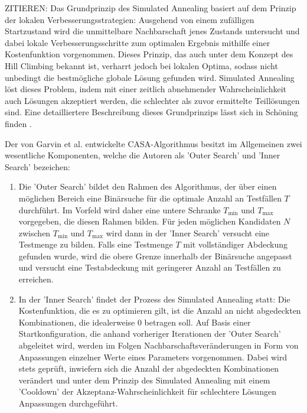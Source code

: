 ZITIEREN: Das Grundprinzip des Simulated Annealing basiert auf dem Prinzip der lokalen Verbesserungsstrategien: Ausgehend von einem zufälligen Startzustand wird die unmittelbare Nachbarschaft jenes Zustands untersucht und dabei lokale Verbesserungsschritte zum optimalen Ergebnis mithilfe einer Kostenfunktion vorgenommen. Dieses Prinzip, das auch unter dem Konzept des Hill Climbing bekannt ist, verharrt jedoch bei lokalen Optima, sodass nicht unbedingt die bestmögliche globale Lösung gefunden wird. Simulated Annealing löst dieses Problem, indem mit einer zeitlich abnehmender Wahrscheinlichkeit auch Lösungen akzeptiert werden, die schlechter als zuvor ermittelte Teillösungen sind. Eine detailliertere Beschreibung dieses Grundprinzips lässt sich in Schöning finden \cite{schoening2001algorithmik}.

Der von Garvin et al. \cite{garvin2011evaluating} entwickelte CASA-Algorithmus besitzt im Allgemeinen zwei wesentliche Komponenten, welche die Autoren als 'Outer Search' und 'Inner Search' bezeichen:
\begin{enumerate}
\item Die 'Outer Search' bildet den Rahmen des Algorithmus, der über einen möglichen Bereich eine Binärsuche für die optimale Anzahl an Testfällen $T$ durchführt. Im Vorfeld wird daher eine untere Schranke $T_{\min}$ und $T_{\max}$ vorgegeben, die diesen Rahmen bilden. Für jeden möglichen Kandidaten $N$ zwischen  $T_{\min}$ und $T_{\max}$ wird dann in der 'Inner Search' versucht eine Testmenge zu bilden. Falls eine Testmenge $T$ mit vollständiger Abdeckung gefunden wurde, wird die obere Grenze innerhalb der Binärsuche angepasst und versucht eine Testabdeckung mit geringerer Anzahl an Testfällen zu erreichen.
\item In der 'Inner Search' findet der Prozess des Simulated Annealing statt: Die Kostenfunktion, die es zu optimieren gilt, ist die Anzahl an nicht abgedeckten Kombinationen, die idealerweise 0 betragen soll. Auf Basis einer Startkonfiguration, die anhand vorheriger Iterationen der 'Outer Search' abgeleitet wird, werden im Folgen Nachbarschaftsveränderungen in Form von Anpassungen einzelner Werte eines Parameters vorgenommen. Dabei wird stets geprüft, inwiefern sich die Anzahl der abgedeckten Kombinationen verändert und unter dem Prinzip des Simulated Annealing mit einem 'Cooldown' der Akzeptanz-Wahrscheinlichkeit für schlechtere Lösungen Anpassungen durchgeführt.
\end{enumerate}

